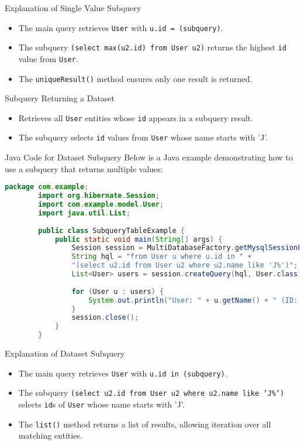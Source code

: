 \documentclass[aspectratio=169, table]{beamer}
\begin{document}
\begin{frame}{Explanation of Single Value Subquery}
	\vspace{20pt}
	\begin{itemize}
		\item The main query retrieves \texttt{User} with \texttt{u.id = (subquery)}.
		\item The subquery \texttt{(select max(u2.id) from User u2)} returns the highest \texttt{id} value from \texttt{User}.
		\item The \texttt{uniqueResult()} method ensures only one result is returned.
	\end{itemize}
\end{frame}

\begin{frame}{Subquery Returning a Dataset}
	\vspace{20pt}
	\begin{itemize}
		\item Retrieves all \texttt{User} entities whose \texttt{id} appears in a subquery result.
		\item The subquery selects \texttt{id} values from \texttt{User} whose name starts with 'J'.
	\end{itemize}
\end{frame}

\begin{frame}[fragile]{Java Code for Dataset Subquery}
	\vspace{20pt}
	Below is a Java example demonstrating how to use a subquery that returns multiple values:
	
	\begin{lstlisting}[language=Java, style=JavaStyle]
		package com.example;
		import org.hibernate.Session;
		import com.example.model.User;
		import java.util.List;
		
		public class SubqueryTableExample {
			public static void main(String[] args) {
				Session session = MultiDatabaseFactory.getMysqlSessionFactory().openSession();
				String hql = "from User u where u.id in " + 
				"(select u2.id from User u2 where u2.name like 'J%')";
				List<User> users = session.createQuery(hql, User.class).list();
				
				for (User u : users) {
					System.out.println("User: " + u.getName() + " (ID: " + u.getId() + ")");
				}
				session.close();
			}
		}
	\end{lstlisting}
\end{frame}

\begin{frame}{Explanation of Dataset Subquery}
	\vspace{20pt}
	\begin{itemize}
		\item The main query retrieves \texttt{User} with \texttt{u.id in (subquery)}.
		\item The subquery \texttt{(select u2.id from User u2 where u2.name like 'J\%')} selects \texttt{id}s of \texttt{User} whose name starts with 'J'.
		\item The \texttt{list()} method returns a list of results, allowing iteration over all matching entities.
	\end{itemize}
\end{frame}
\end{document}
